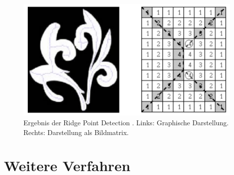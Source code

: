 \begin{figure}
\centering
\includegraphics[width=0.7\linewidth]{./fig/paper_ergebnis}
\caption{Ergebnis der Ridge Point Detection \cite{extracting_skeletons_distancemaps}. Links: Graphische Darstellung. Rechts: Darstellung als Bildmatrix. }
\label{fig:paper_ergebnis}
\end{figure}
\section{Weitere Verfahren}
